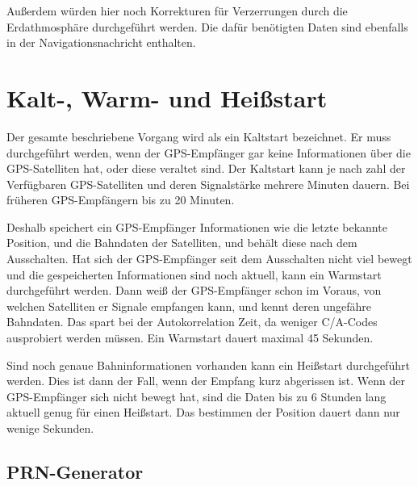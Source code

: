 \documentclass[12pt,a4paper]{scrartcl}
\begin{document}
Außerdem würden hier noch Korrekturen für Verzerrungen durch die Erdathmosphäre durchgeführt werden. Die dafür benötigten Daten sind ebenfalls in der Navigationsnachricht enthalten.

\section{Kalt-, Warm- und Heißstart}
Der gesamte beschriebene Vorgang wird als ein Kaltstart bezeichnet. Er muss durchgeführt werden, wenn der GPS-Empfänger gar keine Informationen über die GPS-Satelliten hat, oder diese veraltet sind. Der Kaltstart kann je nach zahl der Verfügbaren GPS-Satelliten und deren Signalstärke mehrere Minuten dauern. Bei früheren GPS-Empfängern bis zu 20 Minuten.

Deshalb speichert ein GPS-Empfänger Informationen wie die letzte bekannte Position, und die Bahndaten der Satelliten, und behält diese nach dem Ausschalten. Hat sich der GPS-Empfänger seit dem Ausschalten nicht viel bewegt und die gespeicherten Informationen sind noch aktuell, kann ein Warmstart durchgeführt werden. Dann weiß der GPS-Empfänger schon im Voraus, von welchen Satelliten er Signale empfangen kann, und kennt deren ungefähre Bahndaten. Das spart bei der Autokorrelation Zeit, da weniger C/A-Codes ausprobiert werden müssen. Ein Warmstart dauert maximal 45 Sekunden.

Sind noch genaue Bahninformationen vorhanden kann ein Heißstart durchgeführt werden. Dies ist dann der Fall, wenn der Empfang kurz abgerissen ist. Wenn der GPS-Empfänger sich nicht bewegt hat, sind die Daten bis zu 6 Stunden lang aktuell genug für einen Heißstart. Das bestimmen der Position dauert dann nur wenige Sekunden.

\newpage
\printbibliography
\newpage

\begin{appendix}
\section{PRN-Generator}
\end{appendix}
\end{document}

